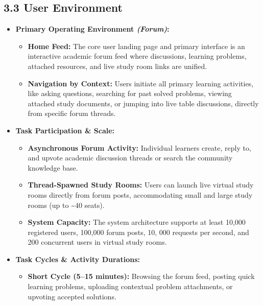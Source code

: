 \documentclass[12pt]{article}
\begin{document}
\subsection*{3.3 User Environment}
\par\medskip
\begin{itemize}
\item \textbf{Primary Operating Environment \emph{(Forum)}:}
\par
\begin{itemize}
\item \textbf{Home Feed:} The core user landing page and primary interface is an interactive academic forum feed where discussions, learning problems, attached resources, and live study room links are unified.
\par
\item \textbf{Navigation by Context:} Users initiate all primary learning activities, like asking questions, searching for past solved problems, viewing attached study documents, or jumping into live table discussions, directly from specific forum threads.
\par
\end{itemize}
\item \textbf{Task Participation \& Scale:}
\par
\begin{itemize}
\item \textbf{Asynchronous Forum Activity:} Individual learners create, reply to, and upvote academic discussion threads or search the community knowledge base.
\par
\item \textbf{Thread-Spawned Study Rooms:} Users can launch live virtual study rooms directly from forum posts, accommodating small and large study rooms (up to \textasciitilde{}40 seats).
\par
\item \textbf{System Capacity:} The system architecture supports at least 10,000 registered users, 100,000 forum posts, 10, 000 requests per second, and 200 concurrent users in virtual study rooms.
\par
\end{itemize}
\item \textbf{Task Cycles \& Activity Durations:}
\par
\begin{itemize}
\item \textbf{Short Cycle (5–15 minutes):} Browsing the forum feed, posting quick learning problems, uploading contextual problem attachments, or upvoting accepted solutions.

\end{itemize}
\end{itemize}
\end{document}
